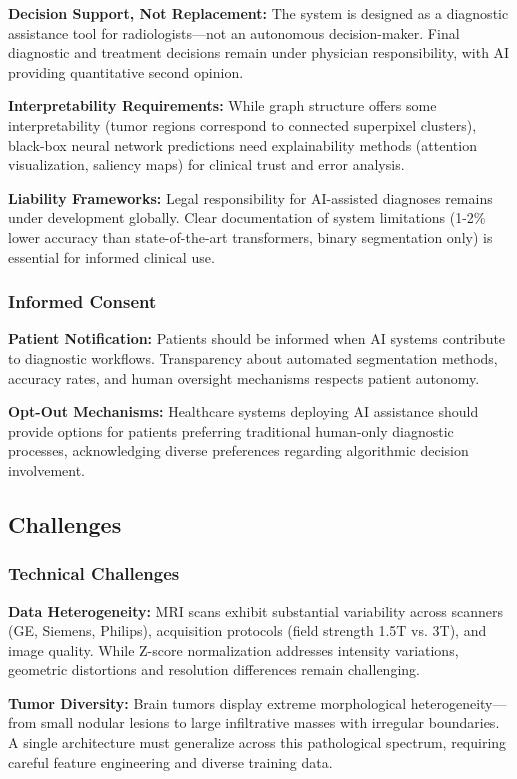 \textbf{Decision Support, Not Replacement:} The system is designed as a diagnostic assistance tool for radiologists—not an autonomous decision-maker. Final diagnostic and treatment decisions remain under physician responsibility, with AI providing quantitative second opinion.

\textbf{Interpretability Requirements:} While graph structure offers some interpretability (tumor regions correspond to connected superpixel clusters), black-box neural network predictions need explainability methods (attention visualization, saliency maps) for clinical trust and error analysis.

\textbf{Liability Frameworks:} Legal responsibility for AI-assisted diagnoses remains under development globally. Clear documentation of system limitations (1-2\% lower accuracy than state-of-the-art transformers, binary segmentation only) is essential for informed clinical use.

\subsubsection{Informed Consent}

\textbf{Patient Notification:} Patients should be informed when AI systems contribute to diagnostic workflows. Transparency about automated segmentation methods, accuracy rates, and human oversight mechanisms respects patient autonomy.

\textbf{Opt-Out Mechanisms:} Healthcare systems deploying AI assistance should provide options for patients preferring traditional human-only diagnostic processes, acknowledging diverse preferences regarding algorithmic decision involvement.


\subsection{Challenges}

\subsubsection{Technical Challenges}

\textbf{Data Heterogeneity:} MRI scans exhibit substantial variability across scanners (GE, Siemens, Philips), acquisition protocols (field strength 1.5T vs. 3T), and image quality. While Z-score normalization addresses intensity variations, geometric distortions and resolution differences remain challenging.

\textbf{Tumor Diversity:} Brain tumors display extreme morphological heterogeneity—from small nodular lesions to large infiltrative masses with irregular boundaries. A single architecture must generalize across this pathological spectrum, requiring careful feature engineering and diverse training data.

